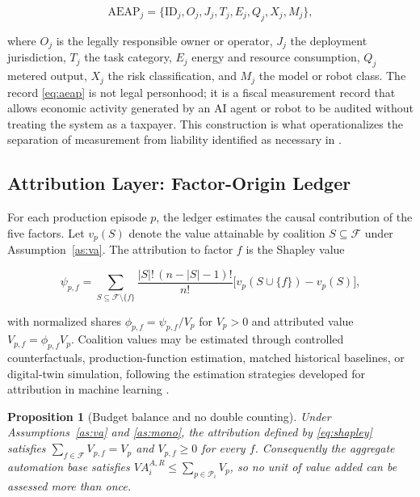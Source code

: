\documentclass[journal]{IEEEtran}
\theoremstyle{plain}
\newtheorem{proposition}{Proposition}
\theoremstyle{definition}
\newcommand{\AEAP}{\mathrm{AEAP}}
\begin{document}
\begin{equation}
\label{eq:aeap}
\AEAP_j = \{\mathrm{ID}_j, O_j, J_j, T_j, E_j, Q_j, X_j, M_j\},
\end{equation}

where $O_j$ is the legally responsible owner or operator, $J_j$ the deployment jurisdiction, $T_j$ the task category, $E_j$ energy and resource consumption, $Q_j$ metered output, $X_j$ the risk classification, and $M_j$ the model or robot class. The record \eqref{eq:aeap} is not legal personhood; it is a fiscal measurement record that allows economic activity generated by an AI agent or robot to be audited without treating the system as a taxpayer. This construction is what operationalizes the separation of measurement from liability identified as necessary in \cite{DimitropoulouAIIncome}.

\subsection{Attribution Layer: Factor-Origin Ledger}

For each production episode $p$, the ledger estimates the causal contribution of the five factors. Let $v_p(S)$ denote the value attainable by coalition $S\subseteq\mathcal{F}$ under Assumption~\ref{as:va}. The attribution to factor $f$ is the Shapley value \cite{Shapley1953}

\begin{equation}
\label{eq:shapley}
\psi_{p,f} = \!\!\sum_{S\subseteq\mathcal{F}\setminus\{f\}}\!\! \frac{|S|!\,(n-|S|-1)!}{n!}\bigl[v_p(S\cup\{f\}) - v_p(S)\bigr],
\end{equation}

with normalized shares $\phi_{p,f} = \psi_{p,f}/V_p$ for $V_p>0$ and attributed value $V_{p,f} = \phi_{p,f}V_p$. Coalition values may be estimated through controlled counterfactuals, production-function estimation, matched historical baselines, or digital-twin simulation, following the estimation strategies developed for attribution in machine learning \cite{LundbergLee2017,GhorbaniZou2019,Jia2019}.

\begin{proposition}[Budget balance and no double counting]
\label{prop:balance}
Under Assumptions~\ref{as:va} and \ref{as:mono}, the attribution defined by \eqref{eq:shapley} satisfies $\sum_{f\in\mathcal{F}} V_{p,f} = V_p$ and $V_{p,f}\ge 0$ for every $f$. Consequently the aggregate automation base satisfies $VA^{A,R}_i \le \sum_{p\in\mathcal{P}_i} V_p$, so no unit of value added can be assessed more than once.
\end{proposition}
\end{document}
